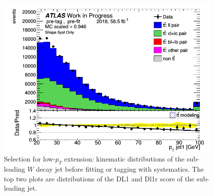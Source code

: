 \documentclass[letterpaper,12pt]{article}
\begin{document}
\begin{figure}[H]
\begin{minipage}[b]{.45\textwidth}
\end{minipage}\hfill
\begin{minipage}[b]{.45\textwidth}
\centering
\includegraphics[width=1\textwidth]{Distribution_March/DataMC_J1_pt.png}
\end{minipage}
\caption{Selection for low-$p_T$ extension: kinematic distributions of the 
sub-leading $W$ decay jet before fitting or tagging with systematics. 
The top two plots are distributions of the DL1 and Dl1r score of the 
sub-leading jet.} \label{fig:lowpT_selection}
\end{figure}
\end{document}
